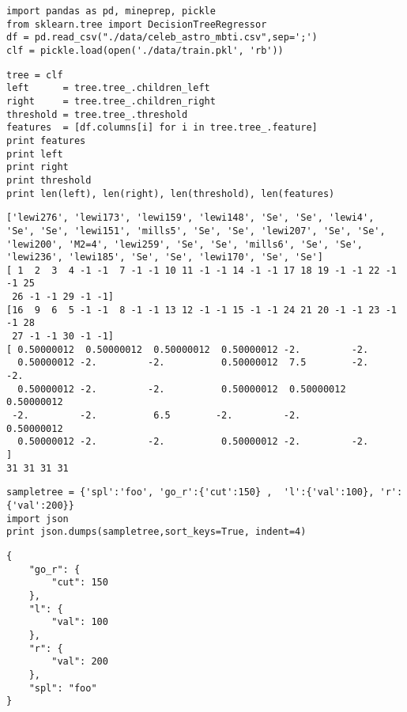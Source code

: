 \documentclass[12pt,fleqn]{article}\usepackage{../common}
\begin{document}
\begin{verbatim}
import pandas as pd, mineprep, pickle
from sklearn.tree import DecisionTreeRegressor
df = pd.read_csv("./data/celeb_astro_mbti.csv",sep=';')
clf = pickle.load(open('./data/train.pkl', 'rb'))
\end{verbatim}


\begin{verbatim}
tree = clf
left      = tree.tree_.children_left
right     = tree.tree_.children_right
threshold = tree.tree_.threshold
features  = [df.columns[i] for i in tree.tree_.feature]
print features
print left
print right
print threshold
print len(left), len(right), len(threshold), len(features)
\end{verbatim}

\begin{verbatim}
['lewi276', 'lewi173', 'lewi159', 'lewi148', 'Se', 'Se', 'lewi4', 'Se', 'Se', 'lewi151', 'mills5', 'Se', 'Se', 'lewi207', 'Se', 'Se', 'lewi200', 'M2=4', 'lewi259', 'Se', 'Se', 'mills6', 'Se', 'Se', 'lewi236', 'lewi185', 'Se', 'Se', 'lewi170', 'Se', 'Se']
[ 1  2  3  4 -1 -1  7 -1 -1 10 11 -1 -1 14 -1 -1 17 18 19 -1 -1 22 -1 -1 25
 26 -1 -1 29 -1 -1]
[16  9  6  5 -1 -1  8 -1 -1 13 12 -1 -1 15 -1 -1 24 21 20 -1 -1 23 -1 -1 28
 27 -1 -1 30 -1 -1]
[ 0.50000012  0.50000012  0.50000012  0.50000012 -2.         -2.
  0.50000012 -2.         -2.          0.50000012  7.5        -2.         -2.
  0.50000012 -2.         -2.          0.50000012  0.50000012  0.50000012
 -2.         -2.          6.5        -2.         -2.          0.50000012
  0.50000012 -2.         -2.          0.50000012 -2.         -2.        ]
31 31 31 31
\end{verbatim}

\begin{verbatim}
sampletree = {'spl':'foo', 'go_r':{'cut':150} ,  'l':{'val':100}, 'r':{'val':200}}
import json
print json.dumps(sampletree,sort_keys=True, indent=4)
\end{verbatim}

\begin{verbatim}
{
    "go_r": {
        "cut": 150
    }, 
    "l": {
        "val": 100
    }, 
    "r": {
        "val": 200
    }, 
    "spl": "foo"
}
\end{verbatim}
\end{document}

